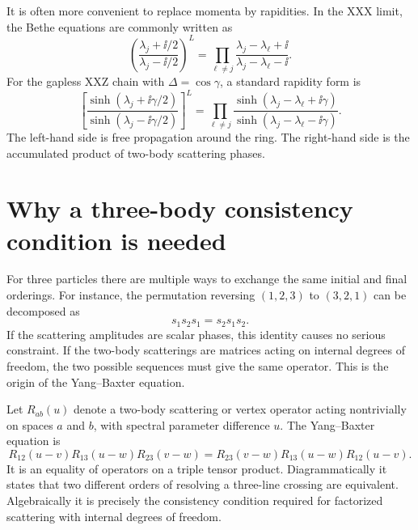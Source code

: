 It is often more convenient to replace momenta by rapidities.  In the XXX limit,
the Bethe equations are commonly written as
\begin{equation}
\label{eq:xxx-bethe-equations-preview}
    \left(
    \frac{\lambda_j+\ii/2}{\lambda_j-\ii/2}
    \right)^L
    =
    \prod_{\ell\neq j}
    \frac{\lambda_j-\lambda_\ell+\ii}
         {\lambda_j-\lambda_\ell-\ii} .
\end{equation}
For the gapless XXZ chain with $\Delta=\cos\gamma$, a standard rapidity form is
\begin{equation}
\label{eq:xxz-bethe-equations-preview}
    \left[
    \frac{\sinh(\lambda_j+\ii\gamma/2)}
         {\sinh(\lambda_j-\ii\gamma/2)}
    \right]^L
    =
    \prod_{\ell\neq j}
    \frac{\sinh(\lambda_j-\lambda_\ell+\ii\gamma)}
         {\sinh(\lambda_j-\lambda_\ell-\ii\gamma)} .
\end{equation}
The left-hand side is free propagation around the ring.  The right-hand side is
the accumulated product of two-body scattering phases.

\section{Why a three-body consistency condition is needed}
\label{sec:three-body-consistency-preview}

For three particles there are multiple ways to exchange the same initial and
final orderings.  For instance, the permutation reversing $(1,2,3)$ to $(3,2,1)$
can be decomposed as
\begin{equation}
    s_1s_2s_1=s_2s_1s_2 .
\end{equation}
If the scattering amplitudes are scalar phases, this identity causes no serious
constraint.  If the two-body scatterings are matrices acting on internal degrees
of freedom, the two possible sequences must give the same operator.  This is the
origin of the Yang--Baxter equation.

Let $R_{ab}(u)$ denote a two-body scattering or vertex operator acting nontrivially
on spaces $a$ and $b$, with spectral parameter difference $u$.  The Yang--Baxter
equation is
\begin{equation}
\label{eq:yang-baxter-equation-preview}
    R_{12}(u-v)R_{13}(u-w)R_{23}(v-w)
    =
    R_{23}(v-w)R_{13}(u-w)R_{12}(u-v) .
\end{equation}
It is an equality of operators on a triple tensor product.  Diagrammatically it
states that two different orders of resolving a three-line crossing are
equivalent.  Algebraically it is precisely the consistency condition required for
factorized scattering with internal degrees of freedom.

